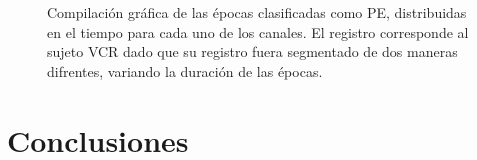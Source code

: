 \begin{figure}
\centering
{}\\
\\
\caption{Compilaci\'on gr\'afica de las \'epocas clasificadas como PE, distribuidas en el tiempo
para cada uno de los canales. El registro corresponde al sujeto VCR dado que su registro fuera
segmentado de dos maneras difrentes, variando la duraci\'on de las \'epocas.}
\label{comp_VCR}
\end{figure}


\section{Conclusiones}

